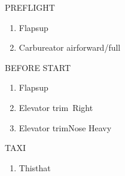 \documentclass[11pt,letterpaper]{article}
\newcommand*{\doctitle}[1]{\centering{\Huge\sf#1}} %
\newcommand*{\protitle}[1]{{\Large\sf#1}} %
\newcommand*{\proitem}[2]{\item#1\dotfill#2} %
\newenvironment*{prolist}[1] %
	{\begin{center}
	\protitle{#1}
	\begin{enumerate}[noitemsep]}
	{\end{enumerate}
	\end{center}}
\begin{document}


	\begin{multicols}{2}

	\begin{prolist}{PREFLIGHT}
		\proitem{Flaps}{up}
		\proitem{Carbureator air}{forward/full}
	\end{prolist}

	\begin{prolist}{BEFORE START}
		\proitem{Flaps}{up}
		\proitem{Elevator trim}{5\textdegree\ Right}
		\proitem{Elevator trim}{Nose Heavy}
	\end{prolist}

	\begin{prolist}{TAXI}
		\proitem{This}{that}
	\end{prolist}

	\end{multicols}
\end{document}
